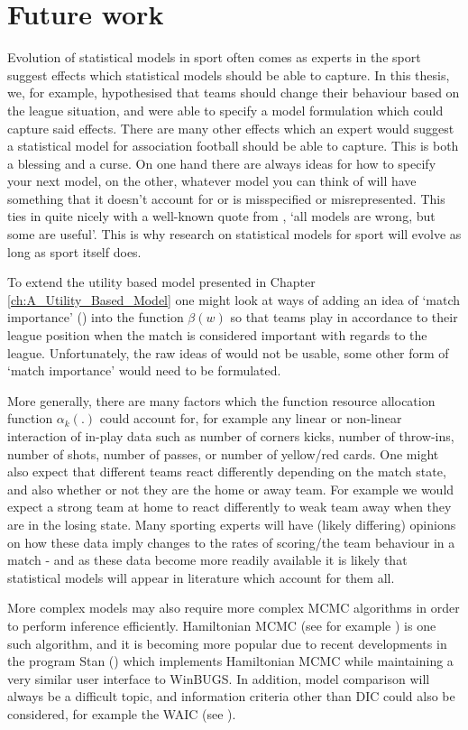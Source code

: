 \section{Future work}

Evolution of statistical models in sport often comes as experts in the sport suggest effects which statistical models
should be able to capture. In this thesis, we, for example, hypothesised that teams should change their behaviour based
on the league situation, and were able to specify a model formulation which could capture said effects. There are many
other effects which an expert would suggest a statistical model for association football should be able to capture. This
is both a blessing and a curse. On one hand there are always ideas for how to specify your next model, on the other,
whatever model you can think of will have something that it doesn't account for or is misspecified or misrepresented.
This ties in quite nicely with a well-known quote from \cite{box1987}, `all models are wrong, but some are useful'. This
is why research on statistical models for sport will evolve as long as sport itself does.

To extend the utility based model presented in Chapter \ref{ch:A_Utility_Based_Model} one might look at ways of adding
an idea of `match importance' (\cite{scarf2008}) into the function \(\beta(w)\) so that teams play in accordance to
their league position when the match is considered important with regards to the league. Unfortunately, the raw ideas of
\cite{scarf2008} would not be usable, some other form of `match importance' would need to be formulated.

More generally, there are many factors which the function resource allocation function \(\alpha_k(.)\) could account
for, for example any linear or non-linear interaction of in-play data such as number of corners kicks, number of
throw-ins, number of shots, number of passes, or number of yellow/red cards. One might also expect that different teams
react differently depending on the match state, and also whether or not they are the home or away team. For example we
would expect a strong team at home to react differently to weak team away when they are in the losing state.
Many sporting experts will have (likely differing) opinions on how these data imply changes to the rates of scoring/the
team behaviour in a match - and as these data become more readily available it is likely that statistical models will
appear in literature which account for them all.

More complex models may also require more complex \gls{MCMC} algorithms in order to perform inference efficiently.
Hamiltonian \gls{MCMC} (see for example \cite{neal2011}) is one such algorithm, and it is becoming more popular due to
recent developments in the program Stan (\cite{stan}) which implements Hamiltonian \gls{MCMC} while maintaining a very
similar user interface to WinBUGS. In addition, model comparison will always be a difficult topic, and information
criteria other than \gls{DIC} could also be considered, for example the \gls{WAIC} (see \cite{vehtari2015}).

